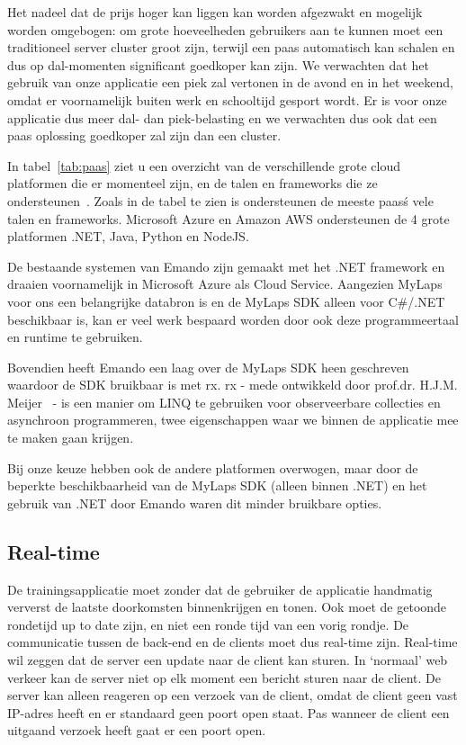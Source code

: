 Het nadeel dat de prijs hoger kan liggen kan worden afgezwakt en mogelijk worden omgebogen: om grote hoeveelheden gebruikers aan te kunnen moet een traditioneel server cluster groot zijn, terwijl een \ac{paas} automatisch kan schalen en dus op dal-momenten significant goedkoper kan zijn. We verwachten dat het gebruik van onze applicatie een piek zal vertonen in de avond en in het weekend, omdat er voornamelijk buiten werk en schooltijd gesport wordt. Er is voor onze applicatie dus meer dal- dan piek-belasting en we verwachten dus ook dat een \ac{paas} oplossing goedkoper zal zijn dan een cluster.

In tabel~\ref{tab:paas} ziet u een overzicht van de verschillende grote cloud platformen die er momenteel zijn, en de talen en frameworks die ze ondersteunen~\cite{paas-list-tomsitpro, azure-scala, aws}. Zoals in de tabel te zien is ondersteunen de meeste \ac{paas}\'s vele talen en frameworks. Microsoft Azure en Amazon AWS ondersteunen de 4 grote platformen .NET, Java, Python en NodeJS.

De bestaande systemen van Emando zijn gemaakt met het .NET framework en draaien voornamelijk in Microsoft Azure als Cloud Service. Aangezien MyLaps voor ons een belangrijke databron is en de MyLaps SDK alleen voor C\#/.NET beschikbaar is, kan er veel werk bespaard worden door ook deze programmeertaal en runtime te gebruiken. 

Bovendien heeft Emando een laag over de MyLaps SDK heen geschreven waardoor de SDK bruikbaar is met \acf{rx}. \ac{rx} - mede ontwikkeld door prof.dr. H.J.M. Meijer~\cite{meijer2011world} - is een manier om LINQ te gebruiken voor observeerbare collecties en asynchroon programmeren, twee eigenschappen waar we binnen de applicatie mee te maken gaan krijgen.

Bij onze keuze hebben ook de andere platformen overwogen, maar door de beperkte beschikbaarheid van de MyLaps SDK (alleen binnen .NET) en het gebruik van .NET door Emando waren dit minder bruikbare opties.

\subsection{Real-time}\label{sec:orientatie-real-time}
De trainingsapplicatie moet zonder dat de gebruiker de applicatie handmatig ververst de laatste doorkomsten binnenkrijgen en tonen. Ook moet de getoonde rondetijd up to date zijn, en niet een ronde tijd van een vorig rondje. De communicatie tussen de back-end en de clients moet dus real-time zijn. Real-time wil zeggen dat de server een update naar de client kan sturen. In `normaal' web verkeer kan de server niet op elk moment een bericht sturen naar de client. De server kan alleen reageren op een verzoek van de client, omdat de client geen vast IP-adres heeft en er standaard geen poort open staat. Pas wanneer de client een uitgaand verzoek heeft gaat er een poort open.

